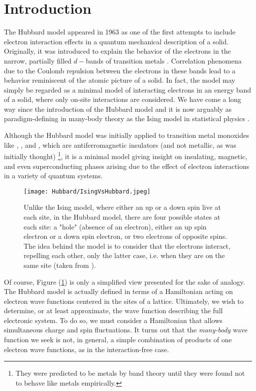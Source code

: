 \section{Introduction}\label{sec:intro}

The Hubbard model appeared in 1963 as one of the first attempts to include electron interaction effects in a quantum mechanical description of a solid.
Originally, it was introduced to explain the behavior of the electrons in the narrow, partially filled $d-$bands of transition metals \cite{Hubbard1963}.
Correlation phenomena due to the Coulomb repulsion between the electrons in these bands lead to a behavior reminiscent of the atomic picture of a solid.
In fact, the model may simply be regarded as a minimal model of interacting electrons in an energy band of a solid, where only on-site interactions are considered.
We have come a long way since the introduction of the Hubbard model and it is now arguably as paradigm-defining in many-body theory as the Ising model in statistical physics \cite{Fazekas1999, Mahan2000, Altland2006}.

Although the Hubbard model was initially applied to transition metal monoxides like , , and , which are antiferromagnetic insulators (and not metallic, as was initially thought) \footnote{They were predicted to be metals by band theory until they were found not to behave like metals empirically.}, it is a minimal model giving insight on insulating, magnetic, and even superconducting phases arising due to the effect of electron interactions in a variety of quantum systems.

\begin{figure}[H]
	\centering
\texttt{[image: Hubbard/IsingVsHubbard.jpeg]}
	\caption[Graphical comparison between the Ising and the Hubbard model.]{Unlike the Ising model, where either an up or a down spin live at each site, in the Hubbard model, there are four possible states at each site: a "hole" (absence of an electron), either an up spin electron or a down spin electron, or two electrons of opposite spins.
	The idea behind the model is to consider that the electrons interact, repelling each other, only the latter case, i.e. when they are on the same site (taken from \cite{Hayes2009}).}
	\label{fig:IsingVsHubbard}
\end{figure}

Of course, Figure (\ref{fig:IsingVsHubbard}) is only a simplified view presented for the sake of analogy.
The Hubbard model is actually defined in terms of a Hamiltonian acting on electron wave functions centered in the sites of a lattice.
Ultimately, we wish to determine, or at least approximate, the wave function describing the full electronic system.
To do so, we must consider a Hamiltonian that allows simultaneous charge and spin fluctuations.
It turns out that the \emph{many-body} wave function we seek is not, in general, a simple combination of products of one electron wave functions, as in the interaction-free case.

